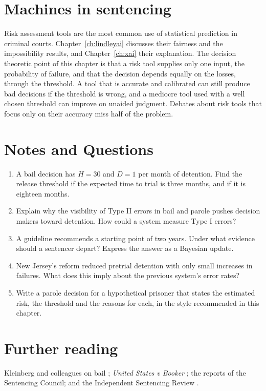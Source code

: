 \section{Machines in sentencing}

Risk assessment tools are the most common use of statistical prediction in criminal courts. Chapter~\ref{ch:lindleyai} discusses their fairness and the impossibility results, and Chapter~\ref{ch:xai} their explanation. The decision theoretic point of this chapter is that a risk tool supplies only one input, the probability of failure, and that the decision depends equally on the losses, through the threshold. A tool that is accurate and calibrated can still produce bad decisions if the threshold is wrong, and a mediocre tool used with a well chosen threshold can improve on unaided judgment. Debates about risk tools that focus only on their accuracy miss half of the problem.

\section*{Notes and Questions}
\begin{enumerate}[label=\arabic*.]
\item A bail decision has $H = 30$ and $D = 1$ per month of detention. Find the release threshold if the expected time to trial is three months, and if it is eighteen months.
\item Explain why the visibility of Type II errors in bail and parole pushes decision makers toward detention. How could a system measure Type I errors?
\item A guideline recommends a starting point of two years. Under what evidence should a sentencer depart? Express the answer as a Bayesian update.
\item New Jersey's reform reduced pretrial detention with only small increases in failures. What does this imply about the previous system's error rates?
\item Write a parole decision for a hypothetical prisoner that states the estimated risk, the threshold and the reasons for each, in the style recommended in this chapter.
\end{enumerate}

\section*{Further reading}
Kleinberg and colleagues on bail \citep{kleinberg2018}; \emph{United States v Booker} \citep{booker2005}; the reports of the Sentencing Council; and the Independent Sentencing Review \citep{gauke2025}.
